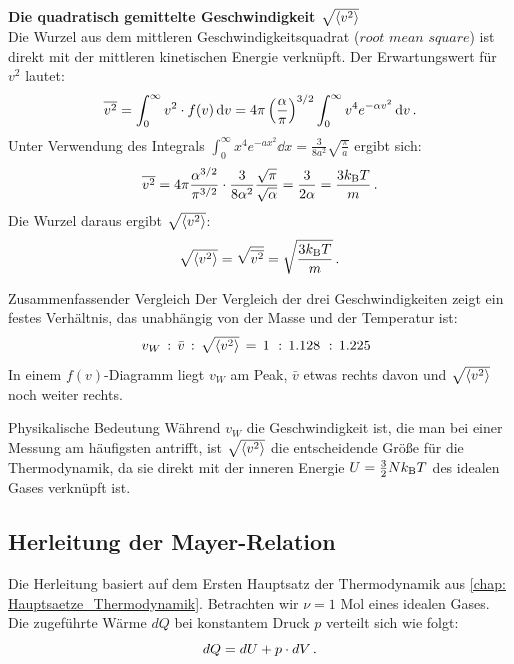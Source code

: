 \textbf{Die quadratisch gemittelte Geschwindigkeit $\sqrt{{\langle{v^2}\rangle}}$}\\
Die Wurzel aus dem mittleren Geschwindigkeitsquadrat ($root$ $mean$ $square$) ist direkt mit der mittleren kinetischen Energie verknüpft. Der Erwartungswert für $v^2$ lautet:
\begin{equation}
    \overline{v^2} = \int_0^\infty v^2 \cdot f(v) \,\mathrm{d} v = 4\pi \left( \frac{\alpha}{\pi} \right)^{3/2} \int_0^\infty v^4 e^{-\alpha v^2} \,\mathrm{d} v \,.
\end{equation}
Unter Verwendung des Integrals $\int_0^\infty x^4 e^{-ax^2} \dd x = \frac{3}{8a^2} \sqrt{\frac{\pi}{a}}$ ergibt sich:
\begin{equation}
    \overline{v^2} = 4\pi \frac{\alpha^{3/2}}{\pi^{3/2}} \cdot \frac{3}{8\alpha^2} \frac{\sqrt{\pi}}{\sqrt{\alpha}} = \frac{3}{2\alpha} = \frac{3 k_{\mathrm{B}} T}{m} \,.
\end{equation}
Die Wurzel daraus ergibt $\sqrt{{\langle{v^2}\rangle}}$:
\begin{equation}\label{eq: mb_v_rms_result}
    \sqrt{{\langle{v^2}\rangle}} = \sqrt{\overline{v^2}} = \sqrt{\frac{3 k_{\mathrm{B}} T}{m}} \,.
\end{equation}

\begin{importantbox}{Zusammenfassender Vergleich}
    Der Vergleich der drei Geschwindigkeiten zeigt ein festes Verhältnis, das unabhängig von der Masse und der Temperatur ist:
    \begin{equation}\label{eq: mb_verhaeltnis}
        v_W \,:\, \bar{v} \,:\, \sqrt{\lrangle{v^2}} \,=\, \qty{1} \,:\, \qty{1.128} \,:\, \qty{1.225} \mDot
    \end{equation}
    In einem $f(v)$-Diagramm liegt $v_W$ am Peak, $\bar{v}$ etwas rechts davon und $\sqrt{{\langle{v^2}\rangle}}$ noch weiter rechts.
\end{importantbox}



\begin{rememberbox}{Physikalische Bedeutung}
    Während $v_W$ die Geschwindigkeit ist, die man bei einer Messung am häufigsten antrifft, ist $\sqrt{{\langle{v^2}\rangle}}$ die entscheidende Größe für die Thermodynamik, da sie direkt mit der inneren Energie $U = \frac{3}{2} N k_{\mathrm{B}} T$ des idealen Gases verknüpft ist.
\end{rememberbox}



\subsection{Herleitung der Mayer-Relation}\label{subsec: herleitung_cp_mayer-relation}
Die Herleitung basiert auf dem Ersten Hauptsatz der Thermodynamik aus \cref{chap: Hauptsaetze_Thermodynamik}. Betrachten wir $\nu = 1$ Mol eines idealen Gases. Die zugeführte Wärme $dQ$ bei konstantem Druck $p$ verteilt sich wie folgt:
\begin{equation}\label{eq: herleitung_1_hauptsatz}
    dQ = dU + p \cdot dV \,.
\end{equation}

